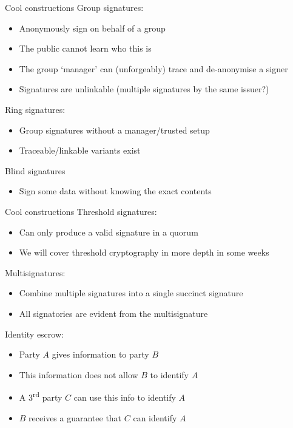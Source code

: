 \begin{frame}{Cool constructions}
  \pause
  Group signatures:
  \begin{itemize}[<+(1)->]
    \item Anonymously sign on behalf of a group
    \item The public cannot learn who this is
    \item The group `manager' can (unforgeably) trace and de-anonymise a signer
    \item Signatures are unlinkable (multiple signatures by the same issuer?)
  \end{itemize}

  \pause
  Ring signatures:
  \begin{itemize}[<+(1)->]
    \item Group signatures without a manager/trusted setup
    \item Traceable/linkable variants exist
  \end{itemize}

  \pause
  Blind signatures
  \begin{itemize}[<+(1)->]
    \item Sign some data without knowing the exact contents
  \end{itemize}
\end{frame}

\begin{frame}{Cool constructions}
  \pause
  Threshold signatures:
  \begin{itemize}[<+(1)->]
    \item Can only produce a valid signature in a quorum
    \item We will cover threshold cryptography in more depth in some weeks
  \end{itemize}

  \pause
  Multisignatures:
  \begin{itemize}[<+(1)->]
    \item Combine multiple signatures into a single succinct signature
    \item All signatories are evident from the multisignature
  \end{itemize}

  \pause
  Identity escrow:
  \begin{itemize}[<+(1)->]
    \item Party $A$ gives information to party $B$
    \item This information does not allow $B$ to identify $A$
    \item A 3\textsuperscript{rd} party $C$ can use this info to identify $A$
    \item $B$ receives a guarantee that $C$ can identify $A$
  \end{itemize}
\end{frame}

